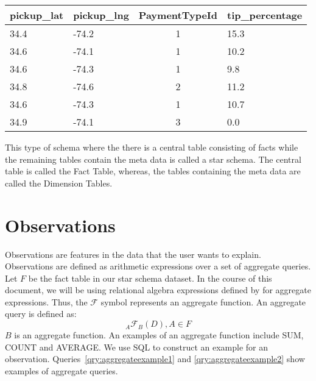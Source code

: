 
\begin{center}
  \begin{tabular}{ | l | l | c | l | }
    \hline
    \textbf{pickup\_lat} & \textbf{pickup\_lng} & \textbf{PaymentTypeId} & \textbf{tip\_percentage} \\ \hline
    34.4 & -74.2 & 1 & 15.3 \\ \hline
    34.6 & -74.1 & 1 & 10.2 \\ \hline
    34.6 & -74.3 & 1 & 9.8 \\ \hline
    34.8 & -74.6 & 2 & 11.2 \\ \hline
    34.6 & -74.3 & 1 & 10.7 \\ \hline
    34.9 & -74.1 & 3 & 0.0 \\
    \hline
  \end{tabular}
\end{center}
\label{tbl:fact}

This type of schema where the there is a central table consisting of facts while the remaining tables contain the meta data is called a star schema. The central table is called the Fact Table, whereas, the tables containing the meta data are called the Dimension Tables.

\section{Observations}
Observations are features in the data that the user wants to explain. Observations are defined as arithmetic expressions over a set of aggregate queries. Let $F$ be the fact table in our star schema dataset. In the course of this document, we will be using relational algebra expressions defined by \cite{elmasri2011fundamentals} for aggregate expressions. Thus, the $\mathscr{F}$ symbol represents an aggregate function. An aggregate query is defined as:
$$_A\mathscr{F}_B(D), A \in F$$
$B$ is an aggregate function. An examples of an aggregate function include SUM, COUNT and AVERAGE.
We use SQL to construct an example for an observation. Queries~\ref{qry:aggregateexample1} and \ref{qry:aggregateexample2} show examples of aggregate queries.


